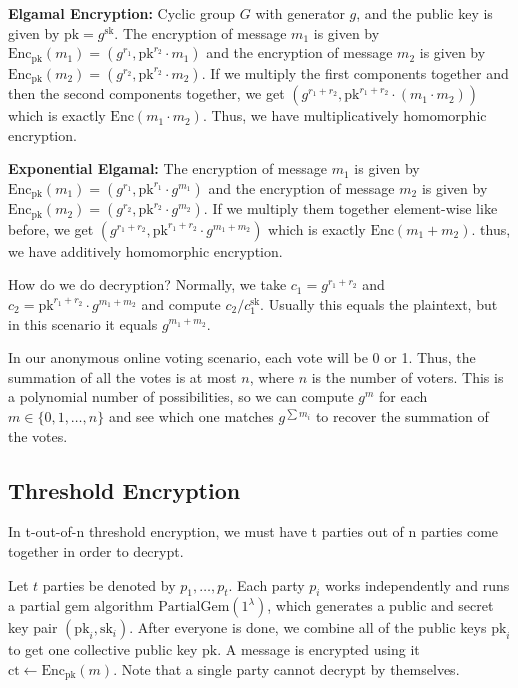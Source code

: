 \begin{example}
\textbf{Elgamal Encryption:} Cyclic group $G$ with generator $g$, and the public key is given by $\text{pk} = g^{\text{sk}}$. The encryption of message $m_1$ is given by $\text{Enc}_\text{pk}(m_1) = (g^{r_1}, \text{pk}^{r_2} \cdot m_1)$ and the encryption of message $m_2$ is given by $\text{Enc}_\text{pk}(m_2) = (g^{r_2}, \text{pk}^{r_2}\cdot m_2)$. If we multiply the first components together and then the second components together, we get $(g^{r_1 + r_2}, \text{pk}^{r_1 + r_2}\cdot (m_1 \cdot m_2))$ which is exactly $\text{Enc}(m_1 \cdot m_2)$. Thus, we have multiplicatively homomorphic encryption.

\textbf{Exponential Elgamal:} The encryption of message $m_1$ is given by $\text{Enc}_{\text{pk}} (m_1) = (g^{r_1}, \text{pk}^{r_1} \cdot g^{m_1})$ and the encryption of message $m_2$ is given by $\text{Enc}_{\text{pk}} (m_2) = (g^{r_2}, \text{pk}^{r_2} \cdot g^{m_2})$. If we multiply them together element-wise like before, we get $(g^{r_1 + r_2}, \text{pk}^{r_1 + r_2}\cdot g^{m_1 + m_2})$ which is exactly $\text{Enc}(m_1 + m_2)$. thus, we have additively homomorphic encryption.

How do we do decryption? Normally, we take $c_1 = g^{r_1 + r_2}$ and $c_2 = \text{pk}^{r_1 + r_2} \cdot g^{m_1 + m_2}$ and compute $c_2 / c_1 ^{\text{sk}}$. Usually this equals the plaintext, but in this scenario it equals $g^{m_1 + m_2}$.

In our anonymous online voting scenario, each vote will be 0 or 1. Thus, the summation of all the votes is at most $n$, where $n$ is the number of voters. This is a polynomial number of possibilities, so we can compute $g^m$ for each $m \in \{0, 1, \dots, n\}$ and see which one matches $g^{\sum m_i}$ to recover the summation of the votes.
\end{example}

\subsection{Threshold Encryption}

\begin{definition}
    In t-out-of-n threshold encryption, we must have t parties out of n parties come together in order to decrypt.
\end{definition}

Let $t$ parties be denoted by $p_1, \dots, p_t$. Each party $p_i$ works independently and runs a partial gem algorithm $\text{PartialGem}(1^{\lambda})$, which generates a public and secret key pair $(\text{pk}_i, \text{sk}_i)$. After everyone is done, we combine all of the public keys $\text{pk}_i$ to get one collective public key $\text{pk}$. A message is encrypted using it $\text{ct} \gets \text{Enc}_{\text{pk}}(m)$. Note that a single party cannot decrypt by themselves.

